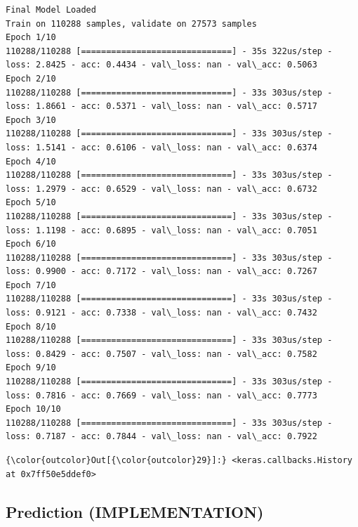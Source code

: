 \documentclass[11pt]{article}
\begin{document}
    \begin{Verbatim}[commandchars=\\\{\}]
Final Model Loaded
Train on 110288 samples, validate on 27573 samples
Epoch 1/10
110288/110288 [==============================] - 35s 322us/step - loss: 2.8425 - acc: 0.4434 - val\_loss: nan - val\_acc: 0.5063
Epoch 2/10
110288/110288 [==============================] - 33s 303us/step - loss: 1.8661 - acc: 0.5371 - val\_loss: nan - val\_acc: 0.5717
Epoch 3/10
110288/110288 [==============================] - 33s 303us/step - loss: 1.5141 - acc: 0.6106 - val\_loss: nan - val\_acc: 0.6374
Epoch 4/10
110288/110288 [==============================] - 33s 303us/step - loss: 1.2979 - acc: 0.6529 - val\_loss: nan - val\_acc: 0.6732
Epoch 5/10
110288/110288 [==============================] - 33s 303us/step - loss: 1.1198 - acc: 0.6895 - val\_loss: nan - val\_acc: 0.7051
Epoch 6/10
110288/110288 [==============================] - 33s 303us/step - loss: 0.9900 - acc: 0.7172 - val\_loss: nan - val\_acc: 0.7267
Epoch 7/10
110288/110288 [==============================] - 33s 303us/step - loss: 0.9121 - acc: 0.7338 - val\_loss: nan - val\_acc: 0.7432
Epoch 8/10
110288/110288 [==============================] - 33s 303us/step - loss: 0.8429 - acc: 0.7507 - val\_loss: nan - val\_acc: 0.7582
Epoch 9/10
110288/110288 [==============================] - 33s 303us/step - loss: 0.7816 - acc: 0.7669 - val\_loss: nan - val\_acc: 0.7773
Epoch 10/10
110288/110288 [==============================] - 33s 303us/step - loss: 0.7187 - acc: 0.7844 - val\_loss: nan - val\_acc: 0.7922

    \end{Verbatim}

\begin{Verbatim}[commandchars=\\\{\}]
{\color{outcolor}Out[{\color{outcolor}29}]:} <keras.callbacks.History at 0x7ff50e5ddef0>
\end{Verbatim}
            
    \subsection{Prediction
(IMPLEMENTATION)}\label{prediction-implementation}
\end{document}
